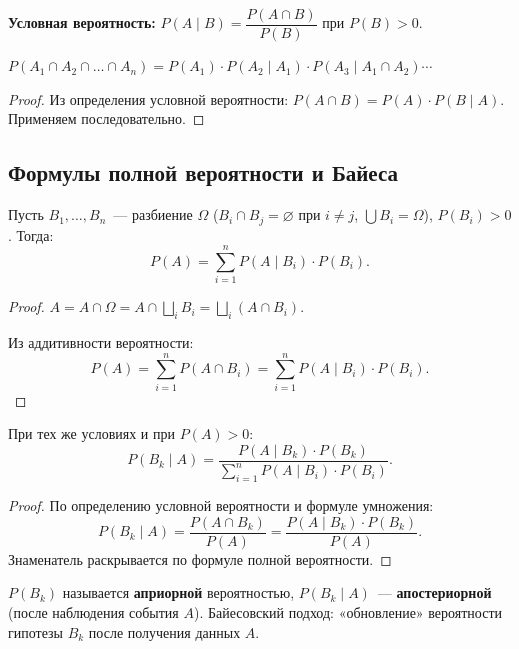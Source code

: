 \documentclass[12pt]{article}
\begin{document}
	\begin{definition}
		\textbf{Условная вероятность:} $P(A \mid B) = \dfrac{P(A \cap B)}{P(B)}$ при $P(B) > 0$.
	\end{definition}
	
	\begin{theorem}
		$P(A_1 \cap A_2 \cap \dots \cap A_n) = P(A_1) \cdot P(A_2 \mid A_1) \cdot P(A_3 \mid A_1 \cap A_2) \cdots$
	\end{theorem}
	
	\begin{proof}
		Из определения условной вероятности: $P(A \cap B) = P(A) \cdot P(B \mid A)$. Применяем последовательно.
	\end{proof}
	
	\subsection{Формулы полной вероятности и Байеса}
	
	\begin{theorem}
		Пусть $B_1, \dots, B_n$~--- разбиение $\Omega$ ($B_i \cap B_j = \varnothing$ при $i \neq j$, $\bigcup B_i = \Omega$), $P(B_i) > 0$. Тогда:
		\[P(A) = \sum_{i=1}^{n} P(A \mid B_i) \cdot P(B_i).\]
	\end{theorem}
	
	\begin{proof}
		$A = A \cap \Omega = A \cap \bigsqcup_{i} B_i = \bigsqcup_{i} (A \cap B_i)$.
		
		Из аддитивности вероятности:
		\[P(A) = \sum_{i=1}^{n} P(A \cap B_i) = \sum_{i=1}^{n} P(A \mid B_i) \cdot P(B_i).\]
	\end{proof}
	
	\begin{theorem}
		При тех же условиях и при $P(A) > 0$:
		\[P(B_k \mid A) = \frac{P(A \mid B_k) \cdot P(B_k)}{\displaystyle\sum_{i=1}^{n} P(A \mid B_i) \cdot P(B_i)}.\]
	\end{theorem}
	
	\begin{proof}
		По определению условной вероятности и формуле умножения:
		\[P(B_k \mid A) = \frac{P(A \cap B_k)}{P(A)} = \frac{P(A \mid B_k) \cdot P(B_k)}{P(A)}.\]
		Знаменатель раскрывается по формуле полной вероятности.
	\end{proof}
	
	\begin{note}
		$P(B_k)$ называется \textbf{априорной} вероятностью, $P(B_k \mid A)$~--- \textbf{апостериорной} (после наблюдения события $A$). Байесовский подход: «обновление» вероятности гипотезы $B_k$ после получения данных $A$.
	\end{note}
	
\end{document}
